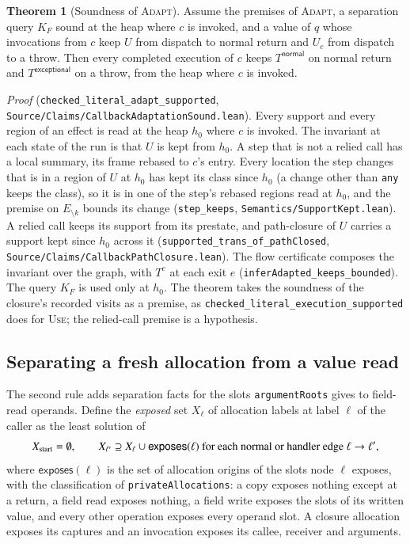 \documentclass[10pt,a4paper]{article}
\newcommand{\ruleName}[1]{\textcolor{rulec}{\textsc{#1}}}
\theoremstyle{definition}
\newtheorem{theorem}{Theorem}
\newcommand{\norm}{\mathsf{normal}}
\newcommand{\exc}{\mathsf{exceptional}}
\newcommand{\code}[1]{\textcolor{codec}{\texttt{#1}}}
\newcommand{\lean}[1]{\textcolor{leanc}{\texttt{\small #1}}}
\begin{document}
\begin{theorem}[Soundness of \ruleName{Adapt}]
Assume the premises of \ruleName{Adapt}, a separation query $K_F$ sound
at the heap where $c$ is invoked, and a value of $q$ whose invocations
from $c$ keep $U$ from dispatch to normal return and $U_c$ from dispatch
to a throw. Then every completed execution of $c$ keeps $T^{\norm}$ on
normal return and $T^{\exc}$ on a throw, from the heap where $c$ is
invoked.
\end{theorem}

\emph{Proof} (\lean{checked\_literal\_adapt\_supported},
\code{Source/Claims/CallbackAdaptationSound.lean}). Every support and
every region of an effect is read at the heap $h_0$ where $c$ is invoked.
The invariant at each state of the run is that $U$ is kept from $h_0$.
A step that is not a relied call has a local summary, its frame rebased to
$c$'s entry. Every location the step changes that is in a region of $U$ at
$h_0$ has kept its class since $h_0$ (a change other than \code{any}
keeps the class), so it is in one of the step's rebased regions read at
$h_0$, and the premise on $E_{\setminus k}$ bounds its change
(\lean{step\_keeps}, \code{Semantics/SupportKept.lean}). A relied call
keeps its support from its prestate, and path-closure of $U$ carries a
support kept since $h_0$ across it (\lean{supported\_trans\_of\_pathClosed},
\code{Source/Claims/CallbackPathClosure.lean}). The flow certificate
composes the invariant over the graph, with $T^e$ at each exit $e$
(\lean{inferAdapted\_keeps\_bounded}). The query $K_F$ is used only at
$h_0$. The theorem takes the soundness of the closure's recorded visits as
a premise, as \lean{checked\_literal\_execution\_supported} does for
\ruleName{Use}; the relied-call premise is a hypothesis.

\subsection{Separating a fresh allocation from a value read}

The second rule adds separation facts for the slots
\lean{argumentRoots} gives to field-read operands. Define the
\emph{exposed} set $X_\ell$ of allocation labels at label $\ell$ of the
caller as the least solution of
\[
X_{\rm start}=\emptyset,\qquad
X_{\ell'}\supseteq X_\ell\cup\mathsf{exposes}(\ell)\ \text{for each normal or
handler edge}\ \ell\to\ell',
\]
where $\mathsf{exposes}(\ell)$ is the set of allocation origins of the
slots node $\ell$ exposes, with the classification of
\lean{privateAllocations}: a copy exposes nothing except at a return, a
field read exposes nothing, a field write exposes the slots of its
written value, and every other operation exposes every operand slot. A
closure allocation exposes its captures and an invocation exposes its
callee, receiver and arguments.
\end{document}
